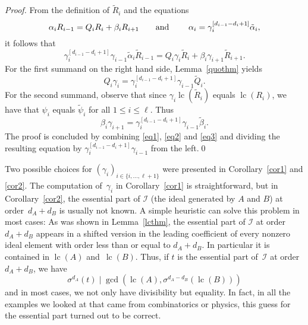 \documentclass[3p,11pt,preprint]{elsarticle}
\newcommand{\lc}{\operatorname{lc}}
\newcommand{\prs}[3]{(#1_i)_{i\in \{#2,\dots,#3\}}}
\begin{document}
\begin{proof}
 From the definition of $\tilde{R}_i$ and the equations
\begin{equation*}
 \alpha_i R_{i-1} = Q_iR_i + \beta_i R_{i+1}\text{\qquad and \qquad}\alpha_i = \gamma_i^{[d_{i-1}-d_i+1]}\tilde{\alpha}_i,
\end{equation*}
it follows that
\begin{equation}
\label{eq1}
 \gamma_i^{[d_{i-1}-d_i+1]}\gamma_{i-1}\tilde{\alpha}_i \tilde{R}_{i-1} = {Q}_i\gamma_i\tilde{R}_i +  {\beta}_i\gamma_{i+1}\tilde{R}_{i+1}.
\end{equation}
For the first summand on the right hand side, Lemma~\ref{quothm} yields
\begin{equation}
\label{eq2}
 {Q}_i\gamma_i = \gamma_i^{[d_{i-1}-d_i+1]}\gamma_{i-1}\tilde{Q}_i.
\end{equation}
For the second summand, observe that since $\gamma_i\lc(\tilde{R}_i)$ equals $\lc(R_i)$, we have that $\psi_i$ equals $\tilde{\psi}_i$ for all $1\leq i\leq\ell$. Thus
\begin{equation}
\label{eq3}
 {\beta}_i\gamma_{i+1} = \gamma_i^{[d_{i-1}-d_i+1]}\gamma_{i-1}\tilde{\beta}_i.
\end{equation}
The proof is concluded by combining \eqref{eq1}, \eqref{eq2} and \eqref{eq3} and dividing the resulting equation by $\gamma_i^{[d_{i-1}-d_i+1]}\gamma_{i-1}$ from the left.\qed
\end{proof}

Two possible choices for $\prs{\gamma}{i}{\ell+1}$ were presented in Corollary~\ref{cor1} and \ref{cor2}. The computation of~$\gamma_i$ in Corollary~\ref{cor1} is straightforward, but in Corollary~\ref{cor2}, the essential part of $\mathcal{I}$ (the ideal generated by $A$ and $B$) at order~$d_A+d_B$ is usually not known. A simple heuristic can solve this problem in most cases: As was shown in Lemma~\ref{lcthm}, the essential part of $\mathcal{I}$ at order~$d_A+d_B$ appears in a shifted version in the leading coefficient of every nonzero ideal element with order less than or equal to $d_A+d_B$. In particular it is contained in $\lc(A)$ and~$\lc(B)$. Thus, if $t$ is the essential part of~$\mathcal{I}$ at order $d_A+d_B$, we have
\begin{equation}
\label{eq5}
\sigma^{d_A}(t) \mid \gcd(\lc(A),\sigma^{d_A-d_B}(\lc(B))) 
\end{equation}
and in most cases, we not only have divisibility but equality. In fact, in all the examples we looked at that came from combinatorics or physics, this guess for the essential part turned out to be correct.
\end{document}
